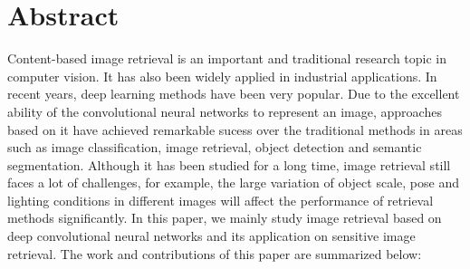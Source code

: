 \chapter*{Abstract}%
Content-based image retrieval is an important and traditional research topic in computer vision. It has also been widely applied in industrial applications. In recent years, deep learning methods have been very popular. Due to the excellent ability of the convolutional neural networks to represent an image, approaches based on it have achieved remarkable sucess over the traditional methods in areas such as image classification, image retrieval, object detection and semantic segmentation. Although it has been studied for a long time, image retrieval still faces a lot of challenges, for example, the large variation of object scale, pose and lighting conditions in different images will affect the performance of retrieval methods significantly. In this paper, we mainly study image retrieval based on deep convolutional neural networks and its application on sensitive image retrieval. The work and contributions of this paper are summarized below:

